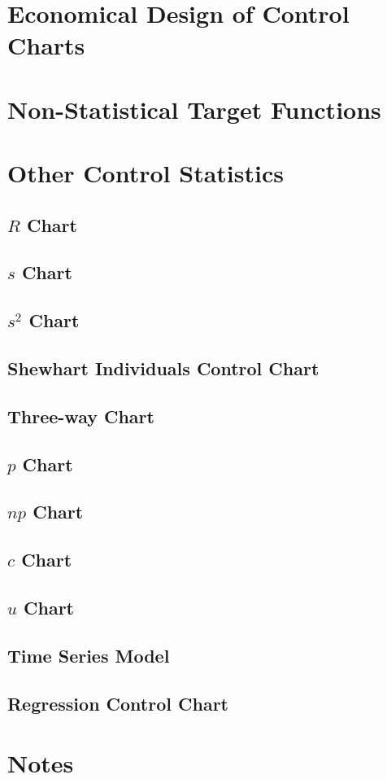 \section{Economical Design of Control Charts}
\label{sec:economical_considerations}




\section{Non-Statistical Target Functions}






\section{Other Control Statistics}
\subsection{$R$ Chart}
\subsection{$s$ Chart}
\subsection{$s^2$ Chart}
\subsection{Shewhart Individuals Control Chart}
\subsection{Three-way Chart}
\subsection{$p$ Chart}
\subsection{$np$ Chart}
\subsection{$c$ Chart}
\subsection{$u$ Chart}
\subsection{Time Series Model}
\subsection{Regression Control Chart}





\section{Notes}


